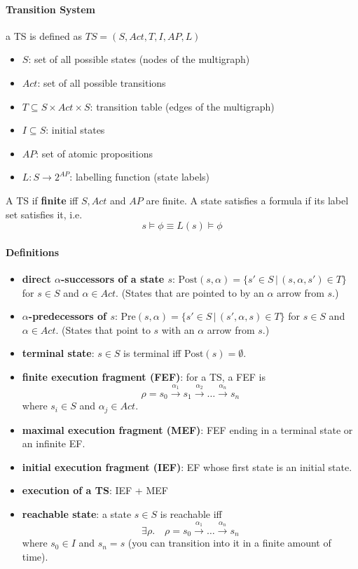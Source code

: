 \documentclass{article}
\begin{document}
\paragraph{Transition System} a TS is defined as $TS = (S, Act, T, I, AP, L)$
\begin{itemize}
\item $S$: set of all possible states (nodes of the multigraph)
\item $Act$: set of all possible transitions
\item $T \subseteq S \times Act \times S$: transition table (edges of the multigraph)
\item $I \subseteq S$: initial states
\item $AP$: set of atomic propositions
\item $L: S\to 2^{AP}$: labelling function (state labels)
\end{itemize}
A TS if \textbf{finite} iff $S, Act$ and $AP$ are finite.
A state satisfies a formula if its label set satisfies it, i.e.
\[
  s \vDash \phi \equiv L(s) \vDash \phi
\]
\paragraph{Definitions}
\begin{itemize}
\item \textbf{direct $\alpha$-successors of a state $s$}: $\text{Post}(s, \alpha) = \{s'
  \in S\,|\,(s,\alpha,s') \in T\}$ for $s\in S$ and $\alpha \in Act$. (States
  that are pointed to by an $\alpha$ arrow from $s$.)

\item \textbf{$\alpha$-predecessors of $s$}: $\text{Pre}(s, \alpha) = \{s'
  \in S\,|\,(s',\alpha,s) \in T\}$ for $s\in S$ and $\alpha \in Act$. (States
  that point to $s$ with an $\alpha$ arrow from $s$.)

\item \textbf{terminal state}: $s \in S $ is terminal iff $\text{Post}(s) = \emptyset$.

\item \textbf{finite execution fragment (FEF)}: for a TS, a FEF is
  \[
    \rho = s_0 \xrightarrow{\alpha_1} s_1 \xrightarrow{\alpha_2} \hdots
    \xrightarrow{\alpha_n} s_n
  \]
  where $s_i \in S$ and $\alpha_j \in Act$.
\item \textbf{maximal execution fragment (MEF)}: FEF ending in a terminal state or an
  infinite EF.

\item \textbf{initial execution fragment (IEF)}: EF whose first state is an
  initial state.

\item \textbf{execution of a TS}: IEF + MEF

\item \textbf{reachable state}: a state $s \in S$ is reachable iff
  \[
    \exists \rho. \quad \rho = s_0 \xrightarrow{\alpha_1} \hdots
    \xrightarrow{\alpha_n} s_n
  \]
  where $s_0 \in I$ and $s_n = s$ (you can transition into it in a finite amount
  of time).
\end{itemize}
\end{document}
